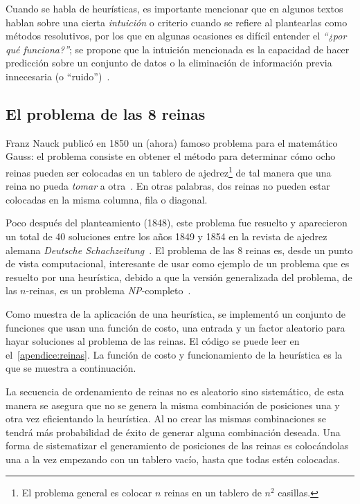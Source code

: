 Cuando se habla de heurísticas, es importante mencionar que en algunos
textos~\cite{Pearl1984} hablan sobre una cierta \textit{intuición} o criterio
cuando se refiere al plantearlas como métodos resolutivos, por
los que en algunas ocasiones es difícil entender el \textit{``¿por qué
  funciona?''}; se propone que la intuición mencionada es la capacidad de hacer
predicción sobre un conjunto de datos o la eliminación de información previa
innecesaria (o ``ruido'')~\cite{Gigerenzer2008}.

\subsection{El problema de las 8 reinas}

Franz Nauck publicó en 1850 un (ahora) famoso problema para el matemático Gauss:
el problema consiste en obtener el método para determinar cómo ocho reinas
pueden ser colocadas en un tablero de ajedrez\footnote{El problema general es
  colocar $n$ reinas en un tablero de $n^{2}$ casillas.} de tal manera que una
reina no pueda \textit{tomar} a otra~\cite{RouseBall2008}. En otras palabras,
dos reinas no pueden estar colocadas en la misma columna, fila o diagonal.



Poco después del planteamiento (1848), este problema fue resuelto y aparecieron
un total de 40 soluciones entre los años 1849 y 1854 en la revista de ajedrez
alemana \textit{Deutsche Schachzeitung}~\cite{Campbell1977}.  El problema de las
8 reinas es, desde un punto de vista computacional, interesante de usar como 
ejemplo de un problema que es resuelto por una heurística, debido a que la 
versión generalizada del problema, de las $n$-reinas, es un problema 
\textsl{NP}-completo~\cite{Gent2017}.

Como muestra de la aplicación de una heurística, se implementó un conjunto de
funciones que usan una función de costo, una entrada y un factor aleatorio para
hayar soluciones al problema de las reinas. El código se puede leer
en el~\cref{apendice:reinas}. La función de costo y funcionamiento de la
heurística es la que se muestra a continuación.

La secuencia de ordenamiento de reinas no es aleatorio sino sistemático, de
esta manera se asegura que no se genera la misma combinación de posiciones una
y otra vez eficientando la heurística. Al no crear las mismas combinaciones
se tendrá más probabilidad de éxito de generar alguna combinación deseada.
Una forma de sistematizar el generamiento de posiciones de las reinas es
colocándolas una a la vez empezando con un tablero vacío, hasta que todas
estén colocadas.

